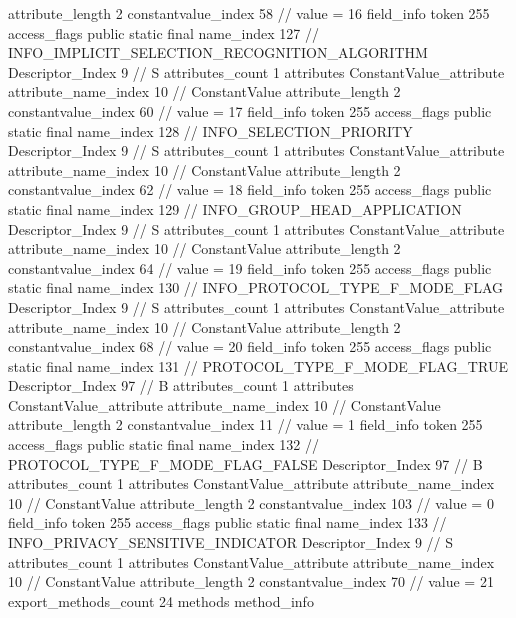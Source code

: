 {{{{{{{					attribute_length	2
					constantvalue_index	58		// value = 16
				}
				}
			}
			field_info {
				token	255
				access_flags	public static final
				name_index	127		// INFO_IMPLICIT_SELECTION_RECOGNITION_ALGORITHM
				Descriptor_Index	9		// S
				attributes_count	1
				attributes {
				ConstantValue_attribute {
					attribute_name_index	10		// ConstantValue
					attribute_length	2
					constantvalue_index	60		// value = 17
				}
				}
			}
			field_info {
				token	255
				access_flags	public static final
				name_index	128		// INFO_SELECTION_PRIORITY
				Descriptor_Index	9		// S
				attributes_count	1
				attributes {
				ConstantValue_attribute {
					attribute_name_index	10		// ConstantValue
					attribute_length	2
					constantvalue_index	62		// value = 18
				}
				}
			}
			field_info {
				token	255
				access_flags	public static final
				name_index	129		// INFO_GROUP_HEAD_APPLICATION
				Descriptor_Index	9		// S
				attributes_count	1
				attributes {
				ConstantValue_attribute {
					attribute_name_index	10		// ConstantValue
					attribute_length	2
					constantvalue_index	64		// value = 19
				}
				}
			}
			field_info {
				token	255
				access_flags	public static final
				name_index	130		// INFO_PROTOCOL_TYPE_F_MODE_FLAG
				Descriptor_Index	9		// S
				attributes_count	1
				attributes {
				ConstantValue_attribute {
					attribute_name_index	10		// ConstantValue
					attribute_length	2
					constantvalue_index	68		// value = 20
				}
				}
			}
			field_info {
				token	255
				access_flags	public static final
				name_index	131		// PROTOCOL_TYPE_F_MODE_FLAG_TRUE
				Descriptor_Index	97		// B
				attributes_count	1
				attributes {
				ConstantValue_attribute {
					attribute_name_index	10		// ConstantValue
					attribute_length	2
					constantvalue_index	11		// value = 1
				}
				}
			}
			field_info {
				token	255
				access_flags	public static final
				name_index	132		// PROTOCOL_TYPE_F_MODE_FLAG_FALSE
				Descriptor_Index	97		// B
				attributes_count	1
				attributes {
				ConstantValue_attribute {
					attribute_name_index	10		// ConstantValue
					attribute_length	2
					constantvalue_index	103		// value = 0
				}
				}
			}
			field_info {
				token	255
				access_flags	public static final
				name_index	133		// INFO_PRIVACY_SENSITIVE_INDICATOR
				Descriptor_Index	9		// S
				attributes_count	1
				attributes {
				ConstantValue_attribute {
					attribute_name_index	10		// ConstantValue
					attribute_length	2
					constantvalue_index	70		// value = 21
				}
				}
			}
			}
			export_methods_count	24
			methods {
				method_info {
}}}}}
